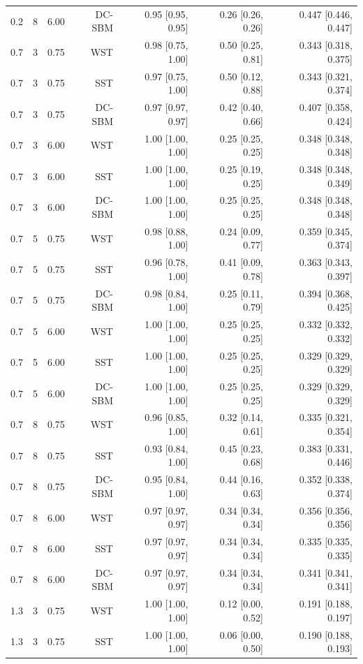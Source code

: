 \begin{table}[!h]
\begin{tabular}[t]{rrrrrrr}
0.2 & 8 & 6.00 & DC-SBM & 0.95 [0.95, 0.95] & 0.26 [0.26, 0.26] & 0.447 [0.446, 0.447]\\
0.7 & 3 & 0.75 & WST & 0.98 [0.75, 1.00] & 0.50 [0.25, 0.81] & 0.343 [0.318, 0.375]\\
0.7 & 3 & 0.75 & SST & 0.97 [0.75, 1.00] & 0.50 [0.12, 0.88] & 0.343 [0.321, 0.374]\\
0.7 & 3 & 0.75 & DC-SBM & 0.97 [0.97, 0.97] & 0.42 [0.40, 0.66] & 0.407 [0.358, 0.424]\\
0.7 & 3 & 6.00 & WST & 1.00 [1.00, 1.00] & 0.25 [0.25, 0.25] & 0.348 [0.348, 0.348]\\
0.7 & 3 & 6.00 & SST & 1.00 [1.00, 1.00] & 0.25 [0.19, 0.25] & 0.348 [0.348, 0.349]\\
0.7 & 3 & 6.00 & DC-SBM & 1.00 [1.00, 1.00] & 0.25 [0.25, 0.25] & 0.348 [0.348, 0.348]\\
0.7 & 5 & 0.75 & WST & 0.98 [0.88, 1.00] & 0.24 [0.09, 0.77] & 0.359 [0.345, 0.374]\\
0.7 & 5 & 0.75 & SST & 0.96 [0.78, 1.00] & 0.41 [0.09, 0.78] & 0.363 [0.343, 0.397]\\
0.7 & 5 & 0.75 & DC-SBM & 0.98 [0.84, 1.00] & 0.25 [0.11, 0.79] & 0.394 [0.368, 0.425]\\
0.7 & 5 & 6.00 & WST & 1.00 [1.00, 1.00] & 0.25 [0.25, 0.25] & 0.332 [0.332, 0.332]\\
0.7 & 5 & 6.00 & SST & 1.00 [1.00, 1.00] & 0.25 [0.25, 0.25] & 0.329 [0.329, 0.329]\\
0.7 & 5 & 6.00 & DC-SBM & 1.00 [1.00, 1.00] & 0.25 [0.25, 0.25] & 0.329 [0.329, 0.329]\\
0.7 & 8 & 0.75 & WST & 0.96 [0.85, 1.00] & 0.32 [0.14, 0.61] & 0.335 [0.321, 0.354]\\
0.7 & 8 & 0.75 & SST & 0.93 [0.84, 1.00] & 0.45 [0.23, 0.68] & 0.383 [0.331, 0.446]\\
0.7 & 8 & 0.75 & DC-SBM & 0.95 [0.84, 1.00] & 0.44 [0.16, 0.63] & 0.352 [0.338, 0.374]\\
0.7 & 8 & 6.00 & WST & 0.97 [0.97, 0.97] & 0.34 [0.34, 0.34] & 0.356 [0.356, 0.356]\\
0.7 & 8 & 6.00 & SST & 0.97 [0.97, 0.97] & 0.34 [0.34, 0.34] & 0.335 [0.335, 0.335]\\
0.7 & 8 & 6.00 & DC-SBM & 0.97 [0.97, 0.97] & 0.34 [0.34, 0.34] & 0.341 [0.341, 0.341]\\
1.3 & 3 & 0.75 & WST & 1.00 [1.00, 1.00] & 0.12 [0.00, 0.52] & 0.191 [0.188, 0.197]\\
1.3 & 3 & 0.75 & SST & 1.00 [1.00, 1.00] & 0.06 [0.00, 0.50] & 0.190 [0.188, 0.193]\\

\end{tabular}
\end{table}
